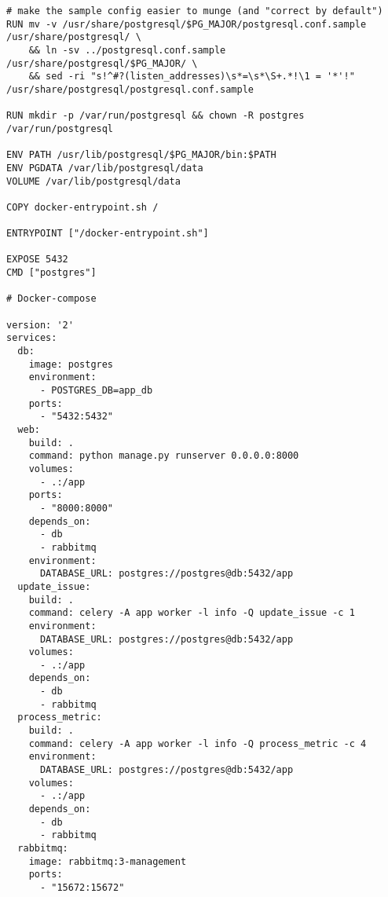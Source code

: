 \documentclass[
	12pt,				%
	openright,			%
	oneside,			%
	a4paper,			%
	chapter=TITLE,		%
	section=TITLE,		%
	english,			%
	french,				%
	spanish,			%
	brazil				%
	]{abntex2}
\begin{document}
\begin{apendicesenv}
\begin{lstlisting}
# make the sample config easier to munge (and "correct by default")
RUN mv -v /usr/share/postgresql/$PG_MAJOR/postgresql.conf.sample /usr/share/postgresql/ \
	&& ln -sv ../postgresql.conf.sample /usr/share/postgresql/$PG_MAJOR/ \
	&& sed -ri "s!^#?(listen_addresses)\s*=\s*\S+.*!\1 = '*'!" /usr/share/postgresql/postgresql.conf.sample

RUN mkdir -p /var/run/postgresql && chown -R postgres /var/run/postgresql

ENV PATH /usr/lib/postgresql/$PG_MAJOR/bin:$PATH
ENV PGDATA /var/lib/postgresql/data
VOLUME /var/lib/postgresql/data

COPY docker-entrypoint.sh /

ENTRYPOINT ["/docker-entrypoint.sh"]

EXPOSE 5432
CMD ["postgres"]

# Docker-compose

version: '2'
services:
  db:
    image: postgres
    environment:
      - POSTGRES_DB=app_db
    ports:
      - "5432:5432"
  web:
    build: .
    command: python manage.py runserver 0.0.0.0:8000
    volumes:
      - .:/app
    ports:
      - "8000:8000"
    depends_on:
      - db
      - rabbitmq
    environment:
      DATABASE_URL: postgres://postgres@db:5432/app
  update_issue:
    build: .
    command: celery -A app worker -l info -Q update_issue -c 1
    environment:
      DATABASE_URL: postgres://postgres@db:5432/app
    volumes:
      - .:/app
    depends_on:
      - db
      - rabbitmq
  process_metric:
    build: .
    command: celery -A app worker -l info -Q process_metric -c 4
    environment:
      DATABASE_URL: postgres://postgres@db:5432/app
    volumes:
      - .:/app
    depends_on:
      - db
      - rabbitmq
  rabbitmq:
    image: rabbitmq:3-management
    ports:
      - "15672:15672"

\end{lstlisting}

\end{apendicesenv}

\begin{anexosenv}

\end{anexosenv}

\label{nropaginas}


\printindex
\end{document}
